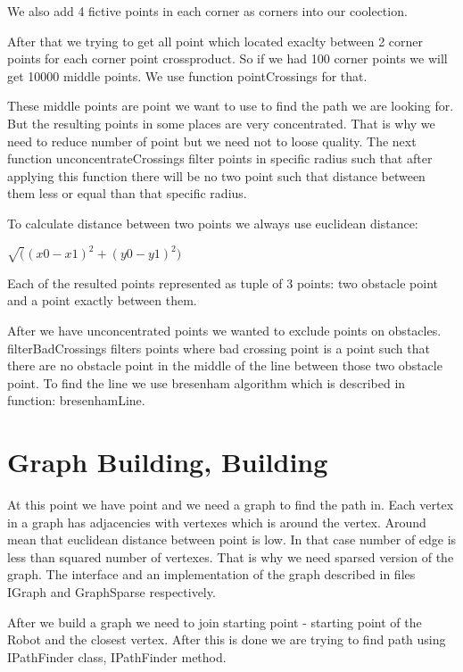\documentclass[12pt]{article}
\begin{document}
We also add 4 fictive points in each corner as corners into our coolection. 

After that we trying to get all point which located exaclty between 2 corner points for each corner point crossproduct. So if we had 100 corner points we will get 10000 middle points. We use function pointCrossings for that.

These middle points are point we want to use to find the path we are looking for. But the resulting points in some places are very concentrated. That is why we need to reduce number of point but we need not to loose quality. The next function unconcentrateCrossings filter points in specific radius such that after applying this function there will be no two point such that distance between them less or equal than that specific radius.

To calculate distance between two points we always use euclidean distance: 

    $\sqrt((x0-x1)^2 + (y0-y1)^2)$

Each of the resulted points represented as tuple of 3 points: two obstacle point and a point exactly between them.

After we have unconcentrated points we wanted to exclude points on obstacles. filterBadCrossings filters points where bad crossing point is a point such that there are no obstacle point in the middle of the line between those two obstacle point. To find the line we use bresenham algorithm which is described in function: bresenhamLine.

\section{Graph Building, Building}

At this point we have point and we need a graph to find the path in. Each vertex in a graph has adjacencies with vertexes which is around the vertex. Around mean that euclidean distance between point is low. In that case number of edge is less than squared number of vertexes. That is why we need sparsed version of the graph. The interface and an implementation of the graph described in files IGraph and GraphSparse respectively.

After we build a graph we need to join starting point - starting point of the Robot and the closest vertex. After this is done we are trying to find path using IPathFinder class, IPathFinder method.




\end{document}
